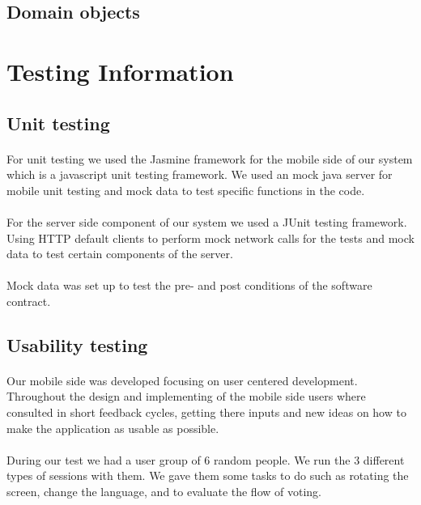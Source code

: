 \documentclass[10pt,a4paper]{article}
\begin{document}
\subsection{Domain objects}
\section{Testing Information}
\subsection{Unit testing}
\paragraph{}For unit testing we used the Jasmine framework for the mobile side of our system which is a javascript unit testing framework. We used an mock java server for mobile unit testing and mock data to test specific functions in the code.
\paragraph{} For the server side component of our system we used a JUnit testing framework. Using HTTP default clients to perform mock network calls for the tests and mock data to test certain components of the server.
\paragraph{}Mock data was set up to test the pre- and post conditions of the software contract.
\subsection{Usability testing}
\paragraph{}Our mobile side was developed focusing on user centered development. Throughout the design and implementing of the mobile side users where consulted in short feedback cycles, getting there inputs and new ideas on how to make the application as usable as possible.
\paragraph{}
During our test we had a user group of 6 random people. We run the 3 different types of sessions with them. We gave them some tasks to do such as rotating the screen, change the language, and to evaluate the flow of voting. 
\end{document}
